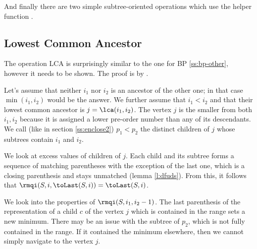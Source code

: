 And finally there are two simple subtree-oriented operations which use the helper function \toLast{}.

\begin{algorithm}
\begin{algorithmic}
		\State {}
	\Else
		\State {}
	\EndIf
\EndFunction
\end{algorithmic}
\end{algorithm}

\begin{algorithm}
\begin{algorithmic}
		\State {}
	\Else
		\State {}
	\EndIf
\EndFunction
\end{algorithmic}
\end{algorithm}

\subsection{Lowest Common Ancestor}

The operation LCA is surprisingly similar to the one for BP \ref{ss:bp-other}, however it needs to be shown.
The proof is by \cite{fischer2010optimal}.

Let's assume that neither $i_1$ nor $i_2$ is an ancestor of the other one; in that case $\min(i_1, i_2)$ would be the answer.
We further assume that $i_1 < i_2$ and that their lowest common ancestor is $j = \lca(i_1, i_2)$.
The vertex $j$ is the smaller from both $i_1, i_2$ because it is assigned a lower pre-order number than any of its descendants.
We call (like in section \ref{ss:enclose2}) $p_1 < p_2$ the distinct children of $j$ whose subtrees contain $i_1$ and $i_2$.

We look at excess values of children of $j$.
Each child and its subtree forms a sequence of matching parentheses with the exception of the last one, which is a closing parenthesis and stays unmatched (lemma \ref{l:dfuds}).
From this, it follows that $\rmqi(S, i, \toLast(S, i)) = \toLast(S, i)$.

We look into the properties of $\rmqi(S, i_1, i_2 - 1)$.
The last parenthesis of the representation of a child $c$ of the vertex $j$ which is contained in the range sets a new minimum.
There may be an issue with the subtree of $p_2$, which is not fully contained in the range.
If it contained the minimum elsewhere, then we cannot simply navigate to the vertex $j$.

